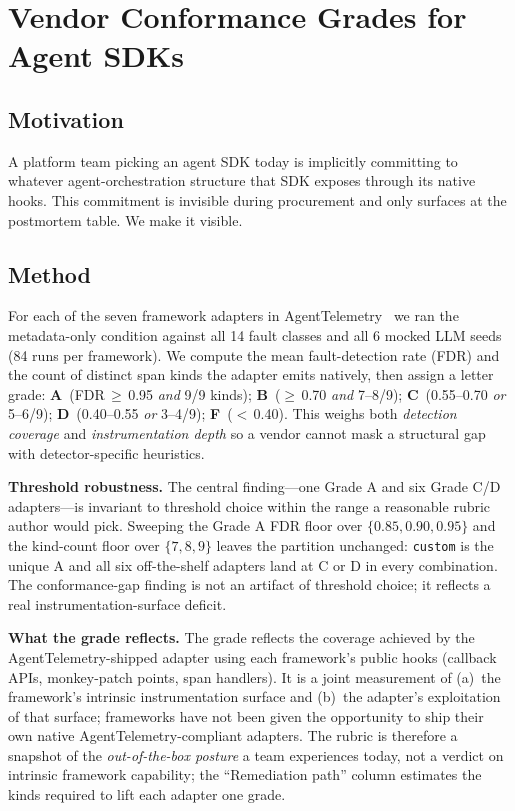 \documentclass[conference]{IEEEtran}
\begin{document}
\section{Vendor Conformance Grades for Agent SDKs}
\label{sec:conformance}

\subsection{Motivation}

A platform team picking an agent SDK today is implicitly committing
to whatever agent-orchestration structure that SDK exposes through
its native hooks. This commitment is invisible during procurement
and only surfaces at the postmortem table. We make it visible.

\subsection{Method}

For each of the seven framework adapters in
AgentTelemetry~\cite{agenttelemetry_aiware} we ran the metadata-only
condition against all 14 fault classes and all 6 mocked LLM seeds
(84 runs per framework). We compute the mean fault-detection rate
(FDR) and the count of distinct span kinds the adapter emits
natively, then assign a letter grade:
\textbf{A}~(FDR\,$\geq$\,0.95 \emph{and} 9/9 kinds);
\textbf{B}~($\geq$\,0.70 \emph{and} 7--8/9);
\textbf{C}~(0.55--0.70 \emph{or} 5--6/9);
\textbf{D}~(0.40--0.55 \emph{or} 3--4/9);
\textbf{F}~($<$\,0.40).
This weighs both \emph{detection coverage} and \emph{instrumentation
depth} so a vendor cannot mask a structural gap with
detector-specific heuristics.

\textbf{Threshold robustness.}
The central finding---one Grade A and six Grade C/D adapters---is
invariant to threshold choice within the range a reasonable rubric
author would pick. Sweeping the Grade A FDR floor over
$\{0.85, 0.90, 0.95\}$ and the kind-count floor over $\{7, 8, 9\}$
leaves the partition unchanged: \texttt{custom} is the unique A and
all six off-the-shelf adapters land at C or D in every combination.
The conformance-gap finding is not an artifact of threshold choice;
it reflects a real instrumentation-surface deficit.

\textbf{What the grade reflects.}
The grade reflects the coverage achieved by the
AgentTelemetry-shipped adapter using each framework's public hooks
(callback APIs, monkey-patch points, span handlers). It is a joint
measurement of (a)~the framework's intrinsic instrumentation
surface and (b)~the adapter's exploitation of that surface;
frameworks have not been given the opportunity to ship their own
native AgentTelemetry-compliant adapters. The rubric is therefore
a snapshot of the \emph{out-of-the-box posture} a team experiences
today, not a verdict on intrinsic framework capability; the
``Remediation path'' column estimates the kinds required to lift
each adapter one grade.
\end{document}
